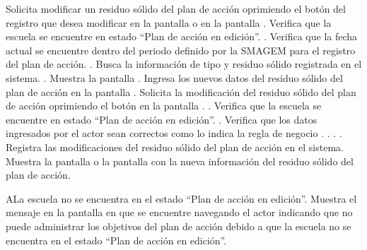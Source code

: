  \begin{UCtrayectoria}
    \UCpaso[\UCactor] Solicita modificar un residuo sólido del plan de acción oprimiendo el botón \botEdit del registro que desea modificar en la pantalla  o en la pantalla .
	\UCpaso[\UCsist] Verifica que la escuela se encuentre en  estado ``Plan de acción en edición''. .
    \UCpaso[\UCsist] Verifica que la fecha actual se encuentre dentro del periodo definido por la SMAGEM para el registro del plan de acción. .    
    \UCpaso[\UCsist] Busca la información de tipo y residuo sólido registrada en el sistema. .
    \UCpaso[\UCsist] Muestra la pantalla .
    \UCpaso[\UCactor] Ingresa los nuevos datos del residuo sólido del plan de acción en la pantalla . \label{cupr2:ingresarInfo}
    \UCpaso[\UCactor] Solicita la modificación del residuo sólido del plan de acción oprimiendo el botón  en la pantalla . .
	\UCpaso[\UCsist] Verifica que la escuela se encuentre en  estado ``Plan de acción en edición''. .    
    \UCpaso[\UCsist] Verifica que los datos ingresados por el actor sean correctos como lo indica la regla de negocio . . . .
    \UCpaso[\UCsist] Registra las modificaciones del residuo sólido del plan de acción en el sistema.
    \UCpaso[\UCsist] Muestra la pantalla  o la pantalla  con la nueva información del residuo sólido del plan de acción. 
    
 \end{UCtrayectoria}
 
\begin{UCtrayectoriaA}{A}{La escuela no se encuentra en el estado ``Plan de acción en edición''.}
    \UCpaso[\UCsist] Muestra el mensaje  en la pantalla en que se encuentre navegando el actor indicando que no puede administrar los objetivos del plan de acción debido a que la escuela no se encuentra en el estado ``Plan de acción en edición''. 
 \end{UCtrayectoriaA}
 
